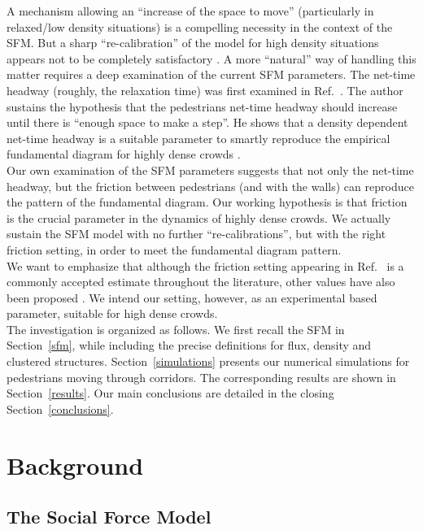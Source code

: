 \documentclass[preprint,12pt]{elsarticle}
\begin{document}
A mechanism allowing an ``increase of the space to move'' (particularly in relaxed/low
 density situations) is a compelling necessity in the context of the SFM.
But a sharp ``re-calibration'' of the model for high density situations appears not 
to be completely satisfactory \cite{johansson}. A more ``natural'' way of 
handling this matter requires a deep examination of the current SFM parameters. 
The net-time headway (roughly, the relaxation time) was first examined in 
Ref.~\cite{johansson}. The author sustains the hypothesis that the 
pedestrians net-time headway should increase until there is ``enough space to 
make a step''.  He shows that a density dependent net-time headway is a 
suitable parameter to smartly reproduce the empirical fundamental diagram for 
highly dense crowds \cite{johansson}.  \\ 

Our own examination of the SFM parameters suggests that not only the net-time 
headway, but the friction between pedestrians (and with the walls) can 
reproduce the pattern of the fundamental diagram. Our working hypothesis is 
that friction is the crucial parameter in the dynamics of highly dense crowds. 
We actually sustain the SFM model with no further ``re-calibrations'', but 
with the right friction setting, in order to meet the fundamental diagram 
pattern. \\  

We want to emphasize that although the friction setting appearing in 
Ref.~\cite{Helbing1} is a commonly accepted estimate throughout the  
literature, other values have also been proposed \cite{colombi2017}. We 
intend our setting, however, as an experimental based parameter, suitable for 
high dense crowds. \\

The investigation is organized as follows. We first recall the SFM in 
Section~\ref{sfm}, while including the precise definitions for flux, density 
and clustered structures. Section~\ref{simulations} presents our numerical 
simulations for pedestrians moving through corridors. The corresponding results 
are shown in Section~\ref{results}. Our main conclusions are detailed in the 
closing Section~\ref{conclusions}.\\     


\section{\label{background}Background}

\subsection{\label{sfm}The Social Force Model}
\end{document}
